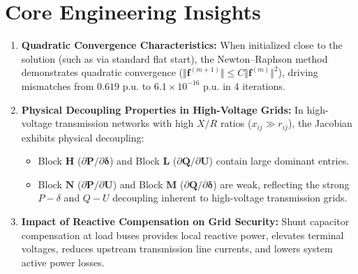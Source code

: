\documentclass[12pt,a4paper,oneside]{report}
\begin{document}
\section{Core Engineering Insights}
\begin{enumerate}
    \item \textbf{Quadratic Convergence Characteristics:} When initialized close to the solution (such as via standard flat start), the Newton--Raphson method demonstrates quadratic convergence ($\Vert \mathbf{f}^{(m+1)} \Vert \le C \Vert \mathbf{f}^{(m)} \Vert^2$), driving mismatches from $0.619\text{ p.u.}$ to $6.1 \times 10^{-16}\text{ p.u.}$ in 4 iterations.
    \item \textbf{Physical Decoupling Properties in High-Voltage Grids:} In high-voltage transmission networks with high $X/R$ ratios ($x_{ij} \gg r_{ij}$), the Jacobian exhibits physical decoupling:
    \begin{itemize}
        \item Block $\mathbf{H}$ ($\partial \mathbf{P} / \partial \boldsymbol{\delta}$) and Block $\mathbf{L}$ ($\partial \mathbf{Q} / \partial \mathbf{U}$) contain large dominant entries.
        \item Block $\mathbf{N}$ ($\partial \mathbf{P} / \partial \mathbf{U}$) and Block $\mathbf{M}$ ($\partial \mathbf{Q} / \partial \boldsymbol{\delta}$) are weak, reflecting the strong $P-\delta$ and $Q-U$ decoupling inherent to high-voltage transmission grids.
    \end{itemize}
    \item \textbf{Impact of Reactive Compensation on Grid Security:} Shunt capacitor compensation at load buses provides local reactive power, elevates terminal voltages, reduces upstream transmission line currents, and lowers system active power losses.
\end{enumerate}
\end{document}
